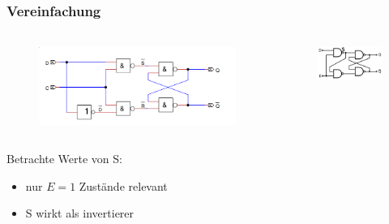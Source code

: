 \begin{frame}
    \frametitle{Vereinfachung}
    \framesubtitle{}
    \begin{columns}[c]
            \begin{figure}[H]
            \begin{center}
                    \includegraphics[scale=0.3]{./img/schaltung/d_latch_neu.png}
            \end{center}
            \end{figure}
            \begin{figure}[H]
            \begin{center}
                    \includegraphics[scale=0.4]{./img/schaltung/D-Latch_2.png}
            \end{center}
            \end{figure}
    \end{columns}
    Betrachte Werte von S: 
            \begin{center}
            \end{center}
        \begin{block}{}
        \begin{center}
            \begin{itemize}
                \item nur $E=1$ Zustände relevant
                \item S wirkt als invertierer
            \end{itemize}
        \end{center}
        \end{block}
\end{frame}
